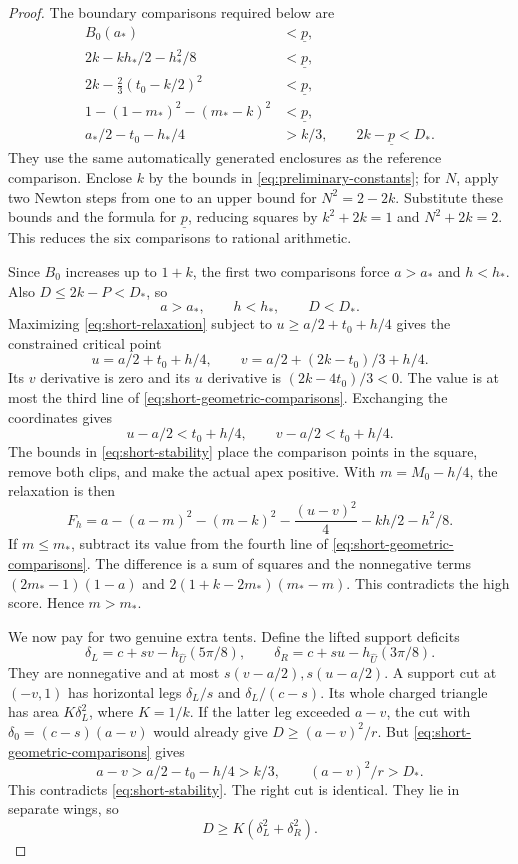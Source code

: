 \begin{proof}
The boundary comparisons required below are
\begin{equation}\label{eq:short-geometric-comparisons}
 \begin{aligned}
 B_0(a_*)&<\underline p,\\
 2k-kh_*/2-h_*^2/8&<\underline p,\\
 2k-\tfrac23(t_0-k/2)^2&<\underline p,\\
 1-(1-m_*)^2-(m_*-k)^2&<\underline p,\\
 a_*/2-t_0-h_*/4&>k/3,\qquad 2k-\underline p<D_*.
 \end{aligned}
\end{equation}
They use the same automatically generated enclosures as the reference
comparison. Enclose $k$ by the bounds in
\cref{eq:preliminary-constants}; for $N$, apply two Newton steps from
one to an upper bound for $N^2=2-2k$. Substitute these bounds and the
formula for $\underline p$, reducing squares by $k^2+2k=1$ and
$N^2+2k=2$. This reduces the six comparisons to rational arithmetic.

Since $B_0$ increases up to $1+k$, the first two comparisons force
$a>a_*$ and $h<h_*$. Also $D\le2k-P<D_*$, so
\begin{equation}\label{eq:short-stability}
 a>a_*,\qquad h<h_*,\qquad D<D_*.
\end{equation}
Maximizing \cref{eq:short-relaxation} subject to
$u\ge a/2+t_0+h/4$ gives the constrained critical point
\[
 u=a/2+t_0+h/4,\qquad v=a/2+(2k-t_0)/3+h/4.
\]
Its $v$ derivative is zero and its $u$ derivative is $(2k-4t_0)/3<0$.
The value is at most the third line of
\cref{eq:short-geometric-comparisons}. Exchanging the coordinates gives
\[
 u-a/2<t_0+h/4,\qquad v-a/2<t_0+h/4.
\]
The bounds in \cref{eq:short-stability} place the comparison points
in the square, remove both clips, and make the actual apex positive.
With $m=M_0-h/4$, the relaxation is then
\[
 F_h=a-(a-m)^2-(m-k)^2-\frac{(u-v)^2}{4}-kh/2-h^2/8.
\]
If $m\le m_*$, subtract its value from the fourth line of
\cref{eq:short-geometric-comparisons}. The difference is a sum of
squares and the nonnegative terms
$(2m_*-1)(1-a)$ and $2(1+k-2m_*)(m_*-m)$.
This contradicts the high score. Hence $m>m_*$.

We now pay for two genuine extra tents. Define the lifted support deficits
\[
 \delta_L=c+sv-h_{\widehat U}(5\pi/8),\qquad
 \delta_R=c+su-h_{\widehat U}(3\pi/8).
\]
They are nonnegative and at most $s(v-a/2),s(u-a/2)$.
A support cut at $(-v,1)$ has horizontal legs
$\delta_L/s$ and $\delta_L/(c-s)$. Its whole charged triangle
has area $K\delta_L^2$, where $K=1/k$.
If the latter leg exceeded $a-v$, the cut with
$\delta_0=(c-s)(a-v)$ would already give $D\ge(a-v)^2/r$.
But \cref{eq:short-geometric-comparisons} gives
\[
 a-v>a/2-t_0-h/4>k/3,\qquad (a-v)^2/r>D_*.
\]
This contradicts \cref{eq:short-stability}. The right cut is identical.
They lie in separate wings, so
\begin{equation}\label{eq:short-cut-payment}
 D\ge K(\delta_L^2+\delta_R^2).
\end{equation}


\end{proof}
